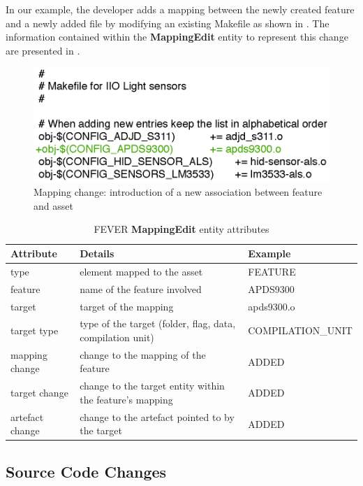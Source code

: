 In our example, the developer adds a mapping between the newly created feature and a newly added file by
modifying an existing Makefile as shown in .
The information contained within the \textbf{MappingEdit} entity to represent this change are presented in .

\begin{figure}[h]
\centering
	\includegraphics[scale=0.5]{Mapping_Diff_NewFeat.eps}
	\caption{Mapping change: introduction of a new association between feature and asset}
	\label{fig:mapping_change_diff}
\end{figure}

\begin{table}[h]
\centering
\resizebox{\textwidth}{!}
{
\begin{tabular}{|l|l|l|}
\hline
Attribute & Details & Example\\
\hline
type 		& element mapped to the asset &  FEATURE \\
\hline
feature		& name of the feature involved & APDS9300 \\
\hline
target		& target of the mapping & apds9300.o\\
\hline
target type	& type of the target (folder, flag, data, compilation unit)  & COMPILATION\_UNIT \\
\hline
mapping change  & change to the mapping of the feature  & ADDED \\
\hline
target change & change to the target entity within the feature's mapping & ADDED \\
\hline
artefact change	    & change to the artefact pointed to by the target & ADDED \\
\hline
\end{tabular}
}
\caption{FEVER \textbf{MappingEdit} entity attributes }
\label{mapping_attrs}
\end{table}

\subsection{Source Code Changes}

